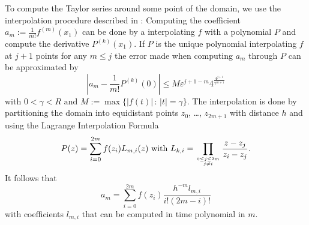 \documentclass{article}
\begin{document}
To compute the Taylor series around some point of the domain, we use the interpolation procedure described in \cite{Mueller87}:
Computing the coefficient $a_m := \frac{1}{m!}f^{(m)}(x_1)$ can be done by a interpolating $f$ with a polynomial $P$ and compute the derivative $P^{(k)}(x_1)$. 
If $P$ is the unique polynomial interpolating $f$ at $j+1$ points for any $m \leq j$ the error made when computing $a_m$ through $P$ can be approximated by  
\[ \left|a_m - \frac{1}{m!}P^{(k)}(0)\right| \leq M\varepsilon^{j+1-m}4^\frac{4^{j+1}}{\gamma^{m+1}} \]
with $0 < \gamma < R \text{ and } M := \max \{|f(t)|\,:\, |t| = \gamma\}$.
The interpolation is done by partitioning the domain into equidistant points $z_0$, \ldots, $z_{2m+1}$ with distance $h$ and using the Lagrange Interpolation Formula  
\[ P(z) = \sum_{i=0}^{2m} f(z_i) L_{m,i}(z) \text{ with } L_{k,i} = \prod_{0 \leq j \leq 2m \atop j \neq i} \frac{z-z_j}{z_i-z_j}. \]
It follows that 
\[ a_m = \sum_{i=0}^{2m} f(z_i)\frac{h^{-m}l_{m,i}}{i!(2m-i)!} \]
with coefficients $l_{m,i}$ that can be computed in time polynomial in $m$. 

\small

{}
\end{document}
